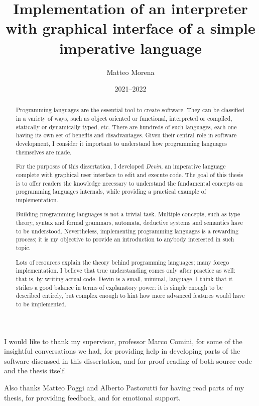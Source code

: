 \documentclass[UdineBachThesis,american,11pt]{PhdThesis}
\author{Matteo Morena}
\date{2021--2022}
\title{Implementation of an interpreter with graphical interface of a simple imperative language}
\begin{document}
  \pagestyle{empty}

  \maketitle

  \cleardoublepage


  \begin{abstract}
    Programming languages are the essential tool to create software. They can be
    classified in a variety of ways, such as object oriented or functional,
    interpreted or compiled, statically or dynamically typed, etc. There are
    hundreds of such languages, each one having its own set of benefits and
    disadvantages. Given their central role in software development, I consider
    it important to understand how programming languages themselves are made.

    For the purposes of this dissertation, I developed \emph{Devin}, an
    imperative language complete with graphical user interface to edit and
    execute code. The goal of this thesis is to offer readers the knowledge
    necessary to understand the fundamental concepts on programming languages
    internals, while providing a practical example of implementation.

    Building programming languages is not a trivial task. Multiple concepts,
    such as type theory, syntax and formal grammars, automata, deductive systems
    and semantics have to be understood. Nevertheless, implementing programming
    languages is a rewarding process; it is my objective to provide an
    introduction to anybody interested in such topic.

    Lots of resources explain the theory behind programming languages; many
    forego implementation. I believe that true understanding comes only after
    practice as well: that is, by writing actual code. Devin is a small,
    minimal, language. I think that it strikes a good balance in terms of
    explanatory power: it is simple enough to be described entirely, but complex
    enough to hint how more advanced features would have to be implemented.
  \end{abstract}


  \begin{acknowledgments}
    I would like to thank my supervisor, professor Marco Comini, for some of the
    insightful conversations we had, for providing help in developing parts of
    the software discussed in this dissertation, and for proof reading of both
    source code and the thesis itself.

    Also thanks Matteo Poggi and Alberto Pastorutti for having read parts of my
    thesis, for providing feedback, and for emotional support.
  \end{acknowledgments}
\end{document}
